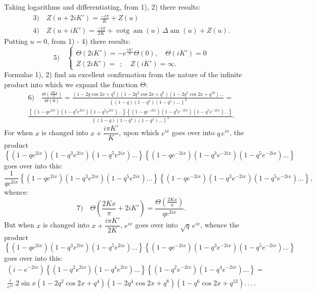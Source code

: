 \documentclass{article}
\begin{document}
Taking logarithms and differentiating, from 1), 2) there results:
\[
\begin{gathered}
\text{3)}\quad Z(u+2iK')=\frac{-i\pi}{K}+Z(u)\\[1.5ex]
\text{4)}\quad Z(u+iK')=\frac{-i\pi}{2K}+\operatorname{cotg}\operatorname{am}(u)\,\Delta\operatorname{am}(u)+Z(u).
\end{gathered}
\]
Putting $u=0$, from 1) - 4) there results:
\[
\text{5)}\quad \left\{\begin{gathered}
\Theta(2iK')=-e^{\frac{\pi K'}{K}}\Theta(0),\quad \Theta(iK')=0\\[1ex]
Z(2iK')=\ \ ;\quad Z(iK')=\infty.
\end{gathered}\right.
\]
Formulae 1), 2) find an excellent confirmation from the nature of the infinite product into which we expand the function $\Theta$:
\[
\begin{gathered}
\text{6)}\quad \frac{\Theta\left(\frac{2Kx}{\pi}\right)}{\Theta(0)}=\frac{(1-2q\cos2x+q^{2})(1-2q^{3}\cos2x+q^{6})(1-2q^{5}\cos2x+q^{10})\ldots}{\left\{(1-q)(1-q^{3})(1-q^{5})\ldots\right\}^{2}}=\\[1.5ex]
\frac{\left\{(1-qe^{2ix})(1-q^{3}e^{2ix})(1-q^{5}e^{2ix}).\,.\right\}\left\{(1-qe^{-2ix})(1-q^{3}e^{-2ix})(1-q^{5}e^{-2ix}).\,.\right\}}{\left\{(1-q)(1-q^{3})(1-q^{5})\ldots\right\}^{2}}.
\end{gathered}
\]
For when $x$ is changed into $x+\dfrac{i\pi K'}{K}$, upon which $e^{ix}$ goes over into $q\,e^{ix}$, the product
\[
\left\{(1-qe^{2ix})(1-q^{3}e^{2ix})(1-q^{5}e^{2ix})\ldots\right\}\left\{(1-qe^{-2ix})(1-q^{3}e^{-2ix})(1-q^{5}e^{-2ix})\ldots\right\}
\]
goes over into this:
\[
\frac{1}{qe^{2ix}}\left\{(1-qe^{2ix})(1-q^{3}e^{2ix})(1-q^{5}e^{2ix})\ldots\right\}\left\{(1-qe^{-2ix})(1-q^{3}e^{-2ix})(1-q^{5}e^{-2ix})\ldots\right\},
\]
whence:
\[
\text{7)}\quad \Theta\left(\frac{2Kx}{\pi}+2iK'\right)=\frac{\Theta\left(\frac{2Kx}{\pi}\right)}{qe^{2ix}}.
\]
But when $x$ is changed into $x+\dfrac{i\pi K'}{2K}$, $e^{ix}$ goes over into $\sqrt{q}\,e^{ix}$, whence the product
\[
\left\{(1-qe^{2ix})(1-q^{3}e^{2ix})(1-q^{5}e^{2ix})\ldots\right\}\left\{(1-qe^{-2ix})(1-q^{3}e^{-2ix})(1-q^{5}e^{-2ix})\ldots\right\}
\]
goes over into this:
\[
\begin{gathered}
(i-e^{-2ix})\left\{(1-q^{2}e^{2ix})(1-q^{4}e^{2ix})\ldots\right\}\left\{(1-q^{2}e^{-2ix})(1-q^{4}e^{-2ix})\ldots\right\}=\\[1.5ex]
\frac{i}{e^{ix}}.2\sin x(1-2q^{2}\cos2x+q^{4})(1-2q^{4}\cos2x+q^{8})(1-q^{6}\cos2x+q^{12}).\,.\,.\,.
\end{gathered}
\]
\end{document}

